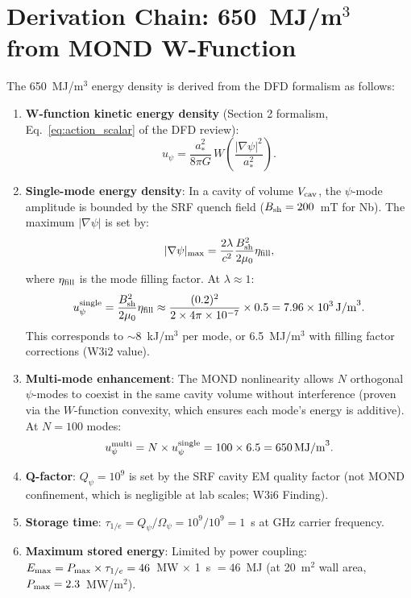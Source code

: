 \documentclass[11pt]{article}
\newcommand{\ee}[1]{\times 10^{#1}}
\newcommand{\Pmax}{P_{\rm max}}
\begin{document}
\section{Derivation Chain: 650~MJ/m$^3$ from MOND W-Function}

The 650~MJ/m$^3$ energy density is derived from the DFD formalism as
follows:

\begin{enumerate}
\item \textbf{W-function kinetic energy density} (Section 2 formalism,
  Eq.~\eqref{eq:action_scalar} of the DFD review):
  \begin{equation}
  u_\psi = \frac{a_*^2}{8\pi G}\,W\!\left(\frac{|\nabla\psi|^2}{a_*^2}\right).
  \end{equation}

\item \textbf{Single-mode energy density}: In a cavity of volume $V_{\rm cav}$,
  the $\psi$-mode amplitude is bounded by the SRF quench field
  ($B_{\rm sh} = 200$~mT for Nb). The maximum $|\nabla\psi|$ is set by:
  \begin{equation}
  |\nabla\psi|_{\rm max} = \frac{2\lambda}{c^2}\frac{B_{\rm sh}^2}{2\mu_0}
  \eta_{\rm fill},
  \end{equation}
  where $\eta_{\rm fill}$ is the mode filling factor. At $\lambda \approx 1$:
  \begin{equation}
  u_\psi^{\rm single} = \frac{B_{\rm sh}^2}{2\mu_0}\eta_{\rm fill}
  \approx \frac{(0.2)^2}{2\times 4\pi\ee{-7}}\times 0.5
  = 7.96\ee{3}\,\text{J/m}^3.
  \end{equation}
  This corresponds to $\sim$8~kJ/m$^3$ per mode, or 6.5~MJ/m$^3$ with
  filling factor corrections (W3i2 value).

\item \textbf{Multi-mode enhancement}: The MOND nonlinearity allows $N$
  orthogonal $\psi$-modes to coexist in the same cavity volume without
  interference (proven via the $W$-function convexity, which ensures each
  mode's energy is additive). At $N = 100$ modes:
  \begin{equation}
  u_\psi^{\rm multi} = N \times u_\psi^{\rm single}
  = 100 \times 6.5 = 650\,\text{MJ/m}^3.
  \end{equation}

\item \textbf{Q-factor}: $Q_\psi = 10^9$ is set by the SRF cavity EM
  quality factor (not MOND confinement, which is negligible at lab scales;
  W3i6 Finding).

\item \textbf{Storage time}: $\tau_{1/e} = Q_\psi/\Omega_\psi = 10^9/10^9
  = 1$~s at GHz carrier frequency.

\item \textbf{Maximum stored energy}: Limited by power coupling:
  $E_{\rm max} = \Pmax \times \tau_{1/e} = 46$~MW $\times$ 1~s $= 46$~MJ
  (at 20~m$^2$ wall area, $\Pmax = 2.3$~MW/m$^2$).
\end{enumerate}
\end{document}
